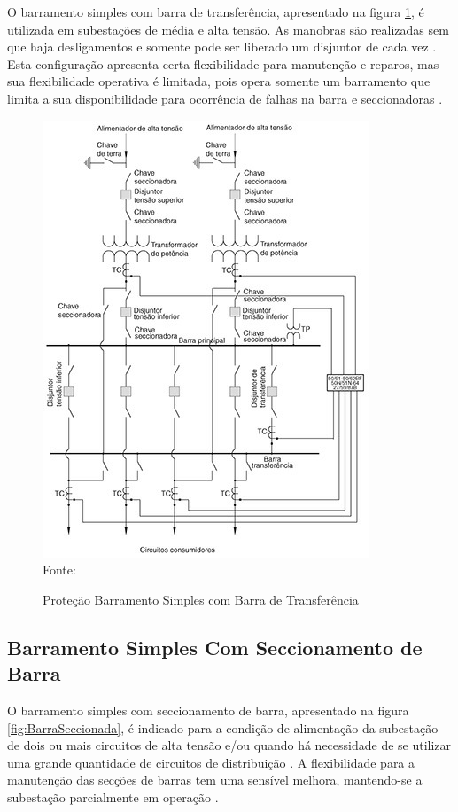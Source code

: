 O barramento simples com barra de transferência, apresentado na figura \ref{fig:BarraTransferencia}, é utilizada em subestações de média e alta tensão. As manobras são realizadas sem que haja desligamentos e somente pode ser liberado um disjuntor de cada vez \cite{frontin2013equipamentos}. Esta configuração apresenta certa flexibilidade para manutenção e reparos, mas sua flexibilidade operativa é limitada, pois opera somente um barramento que limita a sua disponibilidade para ocorrência de falhas na barra e seccionadoras \cite{azevedo2015arranjos}. 

\begin{figure}[!htb] 
    \centering
    \caption{Proteção Barramento Simples com Barra de Transferência}
    \includegraphics[scale = 1]{figuras/BarraTransferencia.png}
    \\ Fonte: \cite{mamede2000protecao}
    \label{fig:BarraTransferencia}
\end{figure}


\subsection{Barramento Simples Com Seccionamento de Barra}

O barramento simples com seccionamento de barra, apresentado na figura \ref{fig:BarraSeccionada}, é indicado para a condição de alimentação da subestação de dois ou mais circuitos de alta tensão e/ou quando há necessidade de se utilizar uma grande quantidade de circuitos de distribuição \cite{mamede2000protecao}. A flexibilidade para a manutenção das secções de barras tem uma sensível melhora, mantendo-se a subestação parcialmente em operação \cite{frontin2013equipamentos}.

